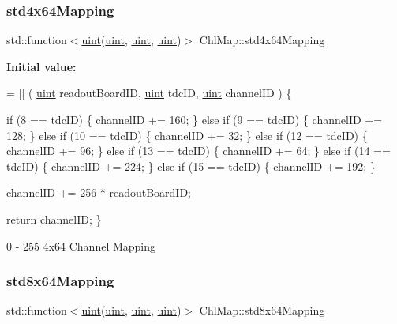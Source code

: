 \subsubsection{\texorpdfstring{std4x64\+Mapping}{std4x64Mapping}}
{\footnotesize\ttfamily std\+::function$<$\hyperlink{namespace_chl_map_a7ef435046de5fb240ed873ae9fe91254}{uint}(\hyperlink{namespace_chl_map_a7ef435046de5fb240ed873ae9fe91254}{uint}, \hyperlink{namespace_chl_map_a7ef435046de5fb240ed873ae9fe91254}{uint}, \hyperlink{namespace_chl_map_a7ef435046de5fb240ed873ae9fe91254}{uint})$>$ Chl\+Map\+::std4x64\+Mapping}

{\bfseries Initial value\+:}
\begin{DoxyCode}
= [] (
    \hyperlink{_packet_8cpp_a69aa29b598b851b0640aa225a9e5d61d}{uint} readoutBoardID,
    \hyperlink{_packet_8cpp_a69aa29b598b851b0640aa225a9e5d61d}{uint} tdcID,
    \hyperlink{_packet_8cpp_a69aa29b598b851b0640aa225a9e5d61d}{uint} channelID
) \{
    
    
    \textcolor{keywordflow}{if} (8 == tdcID) \{
        channelID += 160;
    \} \textcolor{keywordflow}{else} \textcolor{keywordflow}{if} (9 == tdcID) \{
        channelID += 128;
    \} \textcolor{keywordflow}{else} \textcolor{keywordflow}{if} (10 == tdcID) \{
        channelID += 32;
    \} \textcolor{keywordflow}{else} \textcolor{keywordflow}{if} (12 == tdcID) \{
        channelID += 96;
    \} \textcolor{keywordflow}{else} \textcolor{keywordflow}{if} (13 == tdcID) \{
        channelID += 64;
    \} \textcolor{keywordflow}{else} \textcolor{keywordflow}{if} (14 == tdcID) \{
        channelID += 224;
    \} \textcolor{keywordflow}{else} \textcolor{keywordflow}{if} (15 == tdcID) \{
        channelID += 192;
    \}

    channelID += 256 * readoutBoardID;

    \textcolor{keywordflow}{return} channelID;
\}
\end{DoxyCode}


0 -\/ 255 4x64 Channel Mapping 

\mbox{\label{namespace_chl_map_a1c25ae4d560fda9abe7fb0684c6ceae7}} 
\subsubsection{\texorpdfstring{std8x64\+Mapping}{std8x64Mapping}}
{\footnotesize\ttfamily std\+::function$<$\hyperlink{namespace_chl_map_a7ef435046de5fb240ed873ae9fe91254}{uint}(\hyperlink{namespace_chl_map_a7ef435046de5fb240ed873ae9fe91254}{uint}, \hyperlink{namespace_chl_map_a7ef435046de5fb240ed873ae9fe91254}{uint}, \hyperlink{namespace_chl_map_a7ef435046de5fb240ed873ae9fe91254}{uint})$>$ Chl\+Map\+::std8x64\+Mapping}

